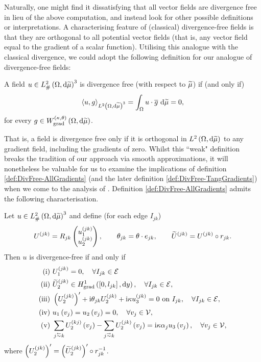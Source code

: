 Naturally, one might find it dissatisfying that all vector fields are divergence free in lieu of the above computation, and instead look for other possible definitions or interpretations.
A characterising feature of (classical) divergence-free fields is that they are orthogonal to all potential vector fields (that is, any vector field equal to the gradient of a scalar function).
Utilising this analogue with the classical divergence, we could adopt the following definition for our analogue of divergence-free fields:
\begin{definition} \label{def:DivFree-AllGradients}
	A field $u\in L^2_{\#}\left( \Omega,\mathrm{d} \widetilde{\mu} \right)^3$ is divergence free (with respect to $\widetilde{\mu}$) if (and only if)
	\begin{align*}
		\left\langle u , g \right\rangle_{L^{2}\left( \Omega,\mathrm{d} \widetilde{\mu} \right)^3} = \int_{\Omega} u\cdot\overline{g}  \ \mathrm{d}\widetilde{\mu} = 0,
	\end{align*}
	for every $g\in W_{\mathrm{grad}}^{\left( \kappa, \theta \right)}\left( \Omega,\mathrm{d}\widetilde{\mu} \right)$.
\end{definition}
That is, a field is divergence free only if it is orthogonal in $L^{2}\left( \Omega,\mathrm{d} \widetilde{\mu} \right)$ to any gradient field, including the gradients of zero.
Whilst this ``weak" definition breaks the tradition of our approach via smooth approximations, it will nonetheless be valuable for us to examine the implications of definition \ref{def:DivFree-AllGradients} (and the later definition \ref{def:DivFree-TangGradients}) when we come to the analysis of .
Definition \ref{def:DivFree-AllGradients} admits the following characterisation.
\begin{prop} \label{prop:DivFree-AllGradsConditions}
	Let $u\in L^2_{\#}\left( \Omega,\mathrm{d} \widetilde{\mu} \right)^3$ and define (for each edge $I_{jk}$)
	\begin{align*}
		U^{(jk)} = R_{jk}\begin{pmatrix} u_1^{(jk)} \\ u_2^{(jk)} \end{pmatrix}, 
		\qquad \theta_{jk} = \theta\cdot e_{jk}, 
		\qquad \widetilde{U}^{(jk)} = U^{(jk)}\circ r_{jk}.
	\end{align*}		
	Then $u$ is divergence-free if and only if
	\begin{align*}
		\mathrm{(i)} \ & U_1^{(jk)} = 0, \quad \forall I_{jk}\in\edgeSet \\
		\mathrm{(ii)} \ & \widetilde{U}_2^{(jk)}\in\gradSob{\sqbracs{0,l_{jk}}}{y}, \quad \forall I_{jk}\in\edgeSet, \\
		\mathrm{(iii)} \ & \bracs{U_2^{(jk)}}' + \rmi\qm_{jk}U_2^{(jk)} + \rmi\wavenumber u_3^{(jk)} = 0 \text{ on } I_{jk}, \quad \forall I_{jk}\in\edgeSet, \\
		\mathrm{(iv)} \ & u_1\bracs{v_j} = u_2\bracs{v_j} = 0, \quad \forall v_j\in\vertSet, \\
		\mathrm{(v)} \ & \sum_{j\conRight k}U_2^{(kj)}\bracs{v_j} - \sum_{j\conLeft k}U_2^{(jk)}\bracs{v_j} = \rmi\wavenumber\alpha_j u_3\bracs{v_j}, \quad \forall v_j\in\vertSet,
	\end{align*}
	where $\left( U_2^{(jk)} \right)' = \left( \widetilde{U}_2^{(jk)} \right)'\circ r_{jk}^{-1}$.
\end{prop}
